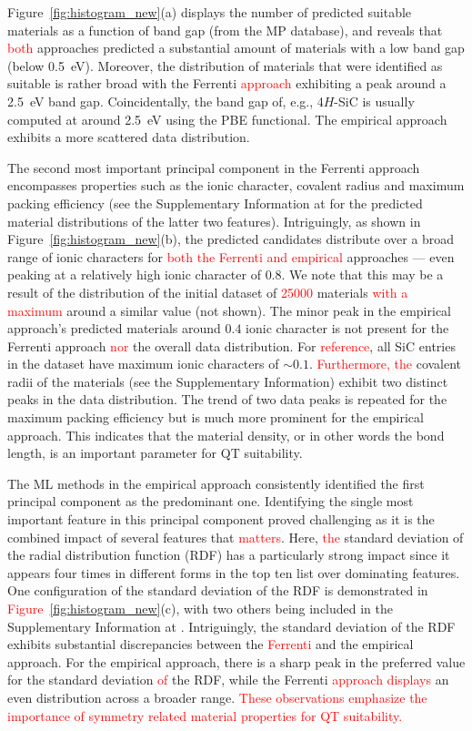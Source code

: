 \documentclass[superscriptaddress,unsortedaddress,
 amsmath,amssymb,
 aps,
]{revtex4-2}
\newcommand{\mrk}[1]{\textcolor{red}{#1}}
\begin{document}
Figure~\ref{fig:histogram_new}(a) displays the number of predicted suitable materials as a function of band gap (from the MP database), and reveals that \mrk{both} approaches predicted a substantial amount of materials with a low band gap (below \SI{0.5}{\electronvolt}). 
Moreover, the distribution of materials that were identified as suitable is rather broad with the Ferrenti \mrk{approach} exhibiting a peak around a \SI{2.5}{\electronvolt} band gap. 
Coincidentally, the band gap of, e.g., 4$H$-SiC is usually computed at around \SI{2.5}{\electronvolt} using the PBE functional. 
The empirical approach exhibits a more scattered data distribution. %

The second most important principal component in the Ferrenti approach encompasses properties such as the ionic character, covalent radius and maximum packing efficiency (see the Supplementary Information at \cite{supplementary} for the predicted material distributions of the latter two features).  
Intriguingly, as shown in  Figure~\ref{fig:histogram_new}(b), the predicted candidates distribute over a broad range of ionic characters for \mrk{both the Ferrenti and empirical} approaches --- even peaking at a relatively high ionic character of $0.8$. 
We note that this may be a result of the distribution of the initial dataset of \mrk{\num{25000}} materials \mrk{with a maximum} around a similar value (not shown). The minor peak in the empirical approach's predicted materials around $0.4$ ionic character is not present for the Ferrenti approach \mrk{nor} the overall data distribution. For \mrk{reference}, all SiC entries in the dataset have maximum ionic characters of $\sim 0.1$. 
\mrk{Furthermore, the} covalent radii of the materials (see the Supplementary Information) exhibit two distinct peaks in the data distribution. 
The trend of two data peaks is repeated for the maximum packing efficiency but is much more prominent for the empirical approach. This indicates that the material density, or in other words the bond length, is an important parameter for QT suitability.  

The ML methods in the empirical approach consistently identified the first principal component as the predominant one. Identifying the single most important feature in this principal component proved challenging as it is the combined impact of several features that \mrk{matters}. 
Here, \mrk{the} standard deviation of the radial distribution function (RDF) has a  particularly strong impact since it appears four times in different forms in the top ten list over dominating features. One configuration of the standard deviation of the RDF is demonstrated in \mrk{Figure}~\ref{fig:histogram_new}(c), with two others being included in the Supplementary Information at \cite{supplementary}. Intriguingly, the standard deviation of the RDF exhibits substantial discrepancies between the \mrk{Ferrenti} and the empirical approach. For the empirical approach, there is a sharp peak in the preferred value for the standard deviation \mrk{of} the RDF, while the Ferrenti \mrk{approach displays} an even distribution across a broader range. 
\mrk{These observations emphasize the importance of symmetry related material properties for QT suitability. } 
\end{document}

